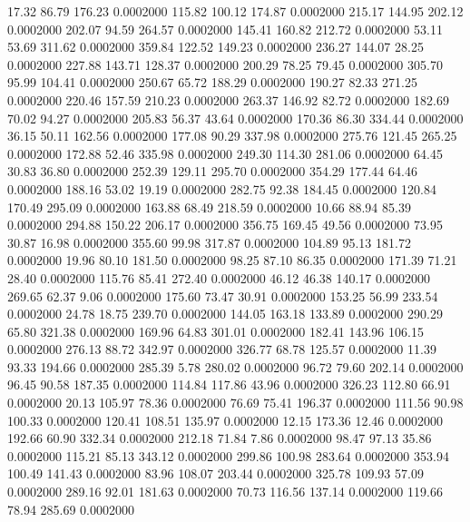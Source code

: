   17.32   86.79  176.23   0.0002000
 115.82  100.12  174.87   0.0002000
 215.17  144.95  202.12   0.0002000
 202.07   94.59  264.57   0.0002000
 145.41  160.82  212.72   0.0002000
  53.11   53.69  311.62   0.0002000
 359.84  122.52  149.23   0.0002000
 236.27  144.07   28.25   0.0002000
 227.88  143.71  128.37   0.0002000
 200.29   78.25   79.45   0.0002000
 305.70   95.99  104.41   0.0002000
 250.67   65.72  188.29   0.0002000
 190.27   82.33  271.25   0.0002000
 220.46  157.59  210.23   0.0002000
 263.37  146.92   82.72   0.0002000
 182.69   70.02   94.27   0.0002000
 205.83   56.37   43.64   0.0002000
 170.36   86.30  334.44   0.0002000
  36.15   50.11  162.56   0.0002000
 177.08   90.29  337.98   0.0002000
 275.76  121.45  265.25   0.0002000
 172.88   52.46  335.98   0.0002000
 249.30  114.30  281.06   0.0002000
  64.45   30.83   36.80   0.0002000
 252.39  129.11  295.70   0.0002000
 354.29  177.44   64.46   0.0002000
 188.16   53.02   19.19   0.0002000
 282.75   92.38  184.45   0.0002000
 120.84  170.49  295.09   0.0002000
 163.88   68.49  218.59   0.0002000
  10.66   88.94   85.39   0.0002000
 294.88  150.22  206.17   0.0002000
 356.75  169.45   49.56   0.0002000
  73.95   30.87   16.98   0.0002000
 355.60   99.98  317.87   0.0002000
 104.89   95.13  181.72   0.0002000
  19.96   80.10  181.50   0.0002000
  98.25   87.10   86.35   0.0002000
 171.39   71.21   28.40   0.0002000
 115.76   85.41  272.40   0.0002000
  46.12   46.38  140.17   0.0002000
 269.65   62.37    9.06   0.0002000
 175.60   73.47   30.91   0.0002000
 153.25   56.99  233.54   0.0002000
  24.78   18.75  239.70   0.0002000
 144.05  163.18  133.89   0.0002000
 290.29   65.80  321.38   0.0002000
 169.96   64.83  301.01   0.0002000
 182.41  143.96  106.15   0.0002000
 276.13   88.72  342.97   0.0002000
 326.77   68.78  125.57   0.0002000
  11.39   93.33  194.66   0.0002000
 285.39    5.78  280.02   0.0002000
  96.72   79.60  202.14   0.0002000
  96.45   90.58  187.35   0.0002000
 114.84  117.86   43.96   0.0002000
 326.23  112.80   66.91   0.0002000
  20.13  105.97   78.36   0.0002000
  76.69   75.41  196.37   0.0002000
 111.56   90.98  100.33   0.0002000
 120.41  108.51  135.97   0.0002000
  12.15  173.36   12.46   0.0002000
 192.66   60.90  332.34   0.0002000
 212.18   71.84    7.86   0.0002000
  98.47   97.13   35.86   0.0002000
 115.21   85.13  343.12   0.0002000
 299.86  100.98  283.64   0.0002000
 353.94  100.49  141.43   0.0002000
  83.96  108.07  203.44   0.0002000
 325.78  109.93   57.09   0.0002000
 289.16   92.01  181.63   0.0002000
  70.73  116.56  137.14   0.0002000
 119.66   78.94  285.69   0.0002000
